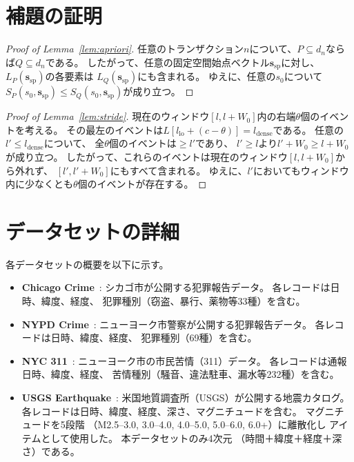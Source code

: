 \section{補題の証明}
\label{sec:proofs}

\begin{proof}[Proof of Lemma~\ref{lem:apriori}]
任意のトランザクション$n$について、$P \subseteq d_n$ならば$Q \subseteq d_n$である。
したがって、任意の固定空間始点ベクトル$\bm{s}_{\mathrm{sp}}$に対し、
$L_P(\bm{s}_{\mathrm{sp}})$の各要素は
$L_Q(\bm{s}_{\mathrm{sp}})$にも含まれる。
ゆえに、任意の$s_0$について
$S_P(s_0,\bm{s}_{\mathrm{sp}}) \leq S_Q(s_0,\bm{s}_{\mathrm{sp}})$が成り立つ。
\end{proof}

\begin{proof}[Proof of Lemma~\ref{lem:stride}]
現在のウィンドウ$[l, l+W_0]$内の右端$\theta$個のイベントを考える。
その最左のイベントは$L[l_{\mathrm{lo}} + (c-\theta)] = l_{\mathrm{dense}}$である。
任意の$l' \leq l_{\mathrm{dense}}$について、
全$\theta$個のイベントは$\geq l'$であり、
$l' \geq l$より$l'+W_0 \geq l+W_0$が成り立つ。
したがって、これらのイベントは現在のウィンドウ$[l,l+W_0]$から外れず、
$[l', l'+W_0]$にもすべて含まれる。
ゆえに、$l'$においてもウィンドウ内に少なくとも$\theta$個のイベントが存在する。
\end{proof}

\section{データセットの詳細}
\label{sec:dataset_details}

各データセットの概要を以下に示す。

\begin{itemize}
\item \textbf{Chicago Crime}~\cite{chicagocrime}:
  シカゴ市が公開する犯罪報告データ。
  各レコードは日時、緯度、経度、
  犯罪種別（窃盗、暴行、薬物等33種）を含む。
\item \textbf{NYPD Crime}~\cite{nypdcrime}:
  ニューヨーク市警察が公開する犯罪報告データ。
  各レコードは日時、緯度、経度、
  犯罪種別（69種）を含む。
\item \textbf{NYC 311}~\cite{nyc311}:
  ニューヨーク市の市民苦情（311）データ。
  各レコードは通報日時、緯度、経度、
  苦情種別（騒音、違法駐車、漏水等232種）を含む。
\item \textbf{USGS Earthquake}~\cite{usgseq}:
  米国地質調査所（USGS）が公開する地震カタログ。
  各レコードは日時、緯度、経度、深さ、マグニチュードを含む。
  マグニチュードを5段階
  （M2.5--3.0, 3.0--4.0, 4.0--5.0, 5.0--6.0, 6.0+）に離散化し
  アイテムとして使用した。
  本データセットのみ4次元
  （時間＋緯度＋経度＋深さ）である。
\end{itemize}

